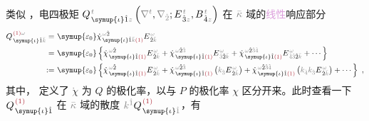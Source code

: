类似 ，电四极矩 $Q^{\;\!\mathcolor{gray}{t}}_{\;\! \symup{\iota} \hat{1} \mathcolor{gray}{z}} \left( \mathcolor{gray}{\nabla^t}, \mathcolor{gray}{\nabla_{\hat{2}}} ; E^{\;\!\mathcolor{gray}{t}}_{\;\! \hat{3}\mathcolor{gray}{z}}, B^{\;\!\mathcolor{gray}{t}}_{\;\! \hat{4}\mathcolor{gray}{z}} \right)$ 在 $\mathcolor{gray}{\bar{\kappa}}$ 域的\textcolor{Plum}{线性}响应部分
\begin{subequations}
\begin{align}
	Q^{\;\! \textcolor{Maroon}{(1)} \mathcolor{gray}{\omega}}_{\;\! \symup{\iota} \hat{1} \mathcolor{gray}{\bar{k}}} =&~ {\symup{\varepsilon_0}} \dot{\chi}^{\;\! \mathcolor{gray}{\omega} \hat{2}}_{\;\! \symup{\iota} \hat{1} \mathcolor{gray}{\bar{k}} \textcolor{Maroon}{(1)}} E^{\;\!\mathcolor{gray}{\omega}}_{\;\! \hat{2} \mathcolor{gray}{\bar{k}}} \\ =&~ {\symup{\varepsilon_0}} \left\{ \dot{\chi}^{\;\! \mathcolor{gray}{\omega} \hat{2}}_{\;\! \symup{\iota} \hat{1} \textcolor{Maroon}{(1)}} E^{\;\!\mathcolor{gray}{\omega}}_{\;\! \hat{2} \mathcolor{gray}{\bar{k}}} + \dot{\chi}^{\;\! \mathcolor{gray}{\omega} \hat{2} \mathcolor{gray}{\hat{3}}}_{\;\! \symup{\iota} \hat{1} \textcolor{Maroon}{(1)}} E^{\;\!\mathcolor{gray}{\omega}}_{\;\! \mathcolor{gray}{\hat{3}} \hat{2} \mathcolor{gray}{\bar{k}}} + \dot{\chi}^{\;\! \mathcolor{gray}{\omega} \hat{2} \mathcolor{gray}{\hat{3} \hat{4}}}_{\;\! \symup{\iota} \hat{1} \textcolor{Maroon}{(1)}} E^{\;\!\mathcolor{gray}{\omega}}_{\;\! \mathcolor{gray}{\hat{4} \hat{3}} \hat{2} \mathcolor{gray}{\bar{k}}} + \cdots \right\}  \label{eq:Q(1)_wk} \\ :=&~ {\symup{\varepsilon_0}} \left\{ \dot{\chi}^{\;\! \mathcolor{gray}{\omega} \hat{2}}_{\;\! \symup{\iota} \hat{1} \textcolor{Maroon}{(1)}} E^{\;\!\mathcolor{gray}{\omega}}_{\;\! \hat{2} \mathcolor{gray}{\bar{k}}} + \dot{\chi}^{\;\! \mathcolor{gray}{\omega} \hat{2} \mathcolor{gray}{\hat{3}}}_{\;\! \symup{\iota} \hat{1} \textcolor{Maroon}{(1)}} \left( \mathcolor{gray}{k_{\hat{3}}} E^{\;\!\mathcolor{gray}{\omega}}_{\;\! \hat{2} \mathcolor{gray}{\bar{k}}} \right) + \dot{\chi}^{\;\! \mathcolor{gray}{\omega} \hat{2} \mathcolor{gray}{\hat{3} \hat{4}}}_{\;\! \symup{\iota} \hat{1} \textcolor{Maroon}{(1)}} \left( \mathcolor{gray}{k_{\hat{4}} k_{\hat{3}}} E^{\;\!\mathcolor{gray}{\omega}}_{\;\! \hat{2} \mathcolor{gray}{\bar{k}}} \right) + \cdots \right\}~,
\end{align}
\end{subequations}
其中， 定义了 $\dot{\chi}$ 为 $Q$ 的极化率，以与 $P$ 的极化率 $\chi$ 区分开来。此时查看一下 $Q^{\;\! \textcolor{Maroon}{(1)}}_{\;\! \symup{\iota} \hat{1}}$ 在 $\mathcolor{gray}{\bar{\kappa}}$ 域的散度 $\mathcolor{gray}{k^{\hat{1}}} Q^{\;\! \textcolor{Maroon}{(1)}}_{\;\! \symup{\iota} \mathcolor{gray}{\hat{1}}}$，有
